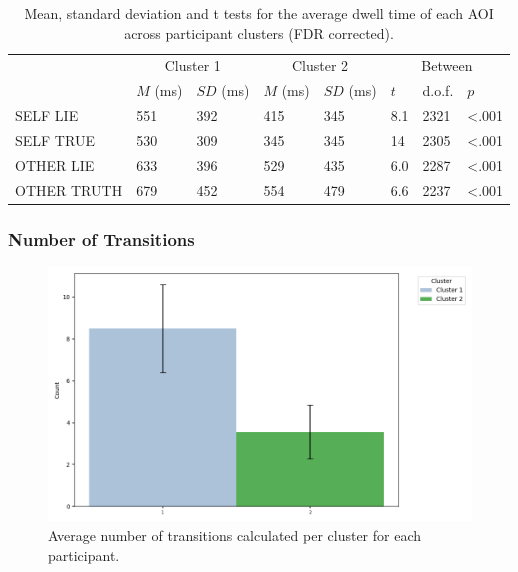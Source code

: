 \documentclass[man, floatsintext]{apa7}
\begin{document}
\begin{table}[H]
	\centering
	\begin{tabular}{|p{1.4cm}|p{1cm}|p{1cm}|p{1cm}|p{1cm}|p{1cm}|p{1cm}|p{1cm}|}
			\hline
			\multirow{2}{*}{} & \multicolumn{2}{c|}{Cluster 1} & \multicolumn{2}{c|}{Cluster 2} & \multicolumn{3}{c|}{Between} \\ \cline{2-8}
			& $M$ (ms) &$SD$ (ms) & $M$ (ms) & $SD$ (ms)  & $t$ & d.o.f. & $p$   \\ \hline
			\small{SELF LIE}& 551 & 392 & 415 & 345 & 8.1 & 2321 & <.001  \\ \hline
			\small{SELF TRUE} & 530 & 309 & 345 & 345& 14 & 2305  &  <.001 \\ \hline
			\small{OTHER LIE} & 633 & 396 &529 & 435 & 6.0 & 2287 &  <.001  \\ \hline
			\small{OTHER TRUTH} & 679 & 452 & 554 & 479 & 6.6 & 2237 &  <.001 \\ \hline
		\end{tabular}
	\vspace{0.3cm}
	\caption{Mean, standard deviation and t tests for the average dwell time of each AOI across participant clusters (FDR corrected).}
	\label{tab:DwellTimesPerCluster}
\end{table}


\subsubsection{Number of Transitions}

\begin{figure}[H]
	\centering
	\includegraphics[width=0.75\linewidth]{../plots/ALLTRIAL/NTransitions.png}
	\caption{Average number of transitions calculated per cluster for each participant.}
	\label{fig:NTransitionsPerCluster}
\end{figure}
\end{document}

